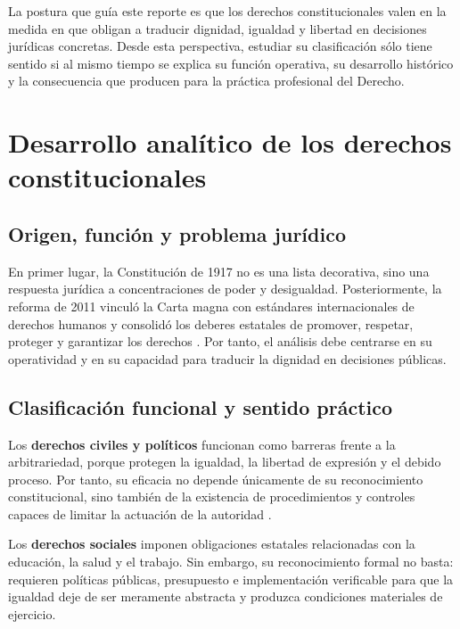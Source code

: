 \documentclass[
	spanish,
	letterpaper, oneside
]{article}
\begin{document}
La postura que guía este reporte es que los derechos constitucionales valen en la medida en que obligan a traducir dignidad, igualdad y libertad en decisiones jurídicas concretas. Desde esta perspectiva, estudiar su clasificación sólo tiene sentido si al mismo tiempo se explica su función operativa, su desarrollo histórico y la consecuencia que producen para la práctica profesional del Derecho.

\section{Desarrollo analítico de los derechos constitucionales}

\subsection{Origen, función y problema jurídico}

En primer lugar, la Constitución de 1917 no es una lista decorativa, sino una respuesta jurídica a concentraciones de poder y desigualdad. Posteriormente, la reforma de 2011 vinculó la Carta magna con estándares internacionales de derechos humanos y consolidó los deberes estatales de promover, respetar, proteger y garantizar los derechos \citep{constitucionCPEUM2026}. Por tanto, el análisis debe centrarse en su operatividad y en su capacidad para traducir la dignidad en decisiones públicas.

\subsection{Clasificación funcional y sentido práctico}

Los \textbf{derechos civiles y políticos} funcionan como barreras frente a la arbitrariedad, porque protegen la igualdad, la libertad de expresión y el debido proceso. Por tanto, su eficacia no depende únicamente de su reconocimiento constitucional, sino también de la existencia de procedimientos y controles capaces de limitar la actuación de la autoridad \citep{constitucionCPEUM2026}.

Los \textbf{derechos sociales} imponen obligaciones estatales relacionadas con la educación, la salud y el trabajo. Sin embargo, su reconocimiento formal no basta: requieren políticas públicas, presupuesto e implementación verificable para que la igualdad deje de ser meramente abstracta y produzca condiciones materiales de ejercicio.
\end{document}
